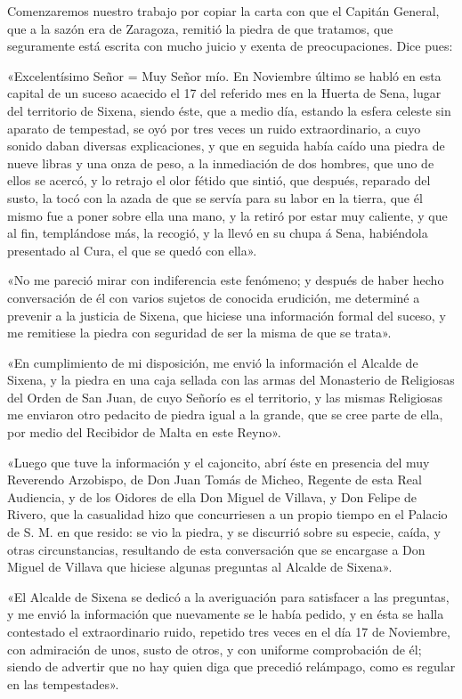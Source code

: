\documentclass[a4paper, 11pt, oneside, polutonikogreek, spanish]{article}
\begin{document}
Comenzaremos nuestro trabajo por copiar la carta con que el Capitán General, que a la sazón era de Zaragoza, remitió la piedra de que tratamos, que seguramente está escrita con mucho juicio y exenta de preocupaciones. Dice pues:

«Excelentísimo Señor = Muy Señor mío. En Noviembre último se habló en esta capital de un suceso acaecido el 17 del referido mes en la Huerta de Sena, lugar del territorio de Sixena, siendo éste, que a medio día, estando la esfera celeste sin aparato de tempestad, se oyó por tres veces un ruido extraordinario, a cuyo sonido daban diversas explicaciones, y que en seguida había caído una piedra de nueve libras y una onza de peso, a la inmediación de dos hombres, que uno de ellos se acercó, y lo retrajo el olor fétido que sintió, que después, reparado del susto, la tocó con la azada de que se servía para su labor en la tierra, que él mismo fue a poner sobre ella una mano, y la retiró por estar muy caliente, y que al fin, templándose más, la recogió, y la llevó en su chupa á Sena, habiéndola presentado al Cura, el que se quedó con ella».

«No me pareció mirar con indiferencia este fenómeno; y después de haber hecho conversación de él con varios sujetos de conocida erudición, me determiné a prevenir a la justicia de Sixena, que hiciese una información formal del suceso, y me remitiese la piedra con seguridad de ser la misma de que se trata».

«En cumplimiento de mi disposición, me envió la información el Alcalde de Sixena, y la piedra en una caja sellada con las armas del Monasterio de Religiosas del Orden de San Juan, de cuyo Señorío es el territorio, y las mismas Religiosas me enviaron otro pedacito de piedra igual a la grande, que se cree parte de ella, por medio del Recibidor de Malta en este Reyno».

«Luego que tuve la información y el cajoncito, abrí éste en presencia del muy Reverendo Arzobispo, de Don Juan Tomás de Micheo, Regente de esta Real Audiencia, y de los Oidores de ella Don Miguel de Villava, y Don Felipe de Rivero, que la casualidad hizo que concurriesen a un propio tiempo en el Palacio de S. M. en que resido: se vio la piedra, y se discurrió sobre su especie, caída, y otras circunstancias, resultando de esta conversación que se encargase a Don Miguel de Villava que hiciese algunas preguntas al Alcalde de Sixena».

«El Alcalde de Sixena se dedicó a la averiguación para satisfacer a las preguntas, y me envió la información que nuevamente se le había pedido, y en ésta se halla contestado el extraordinario ruido, repetido tres veces en el día 17 de Noviembre, con admiración de unos, susto de otros, y con uniforme comprobación de él; siendo de advertir que no hay quien diga que precedió relámpago, como es regular en las tempestades».
\end{document}
